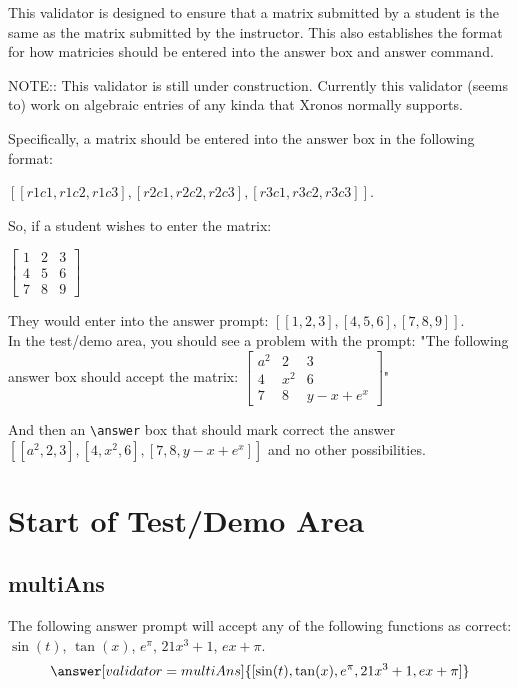 \documentclass{ximera}
\begin{document}
        This validator is designed to ensure that a matrix submitted by a student is the same as the matrix submitted by the instructor. This also establishes the format for how matricies should be entered into the answer box and answer command.
    
        NOTE:: This validator is still under construction. Currently this validator (seems to) work on algebraic entries of any kinda that Xronos normally supports.
        
        Specifically, a matrix should be entered into the answer box in the following format:
        
        $[ [r1c1,r1c2,r1c3],[r2c1,r2c2,r2c3],[r3c1,r3c2,r3c3] ]$.
        
        So, if a student wishes to enter the matrix:
        
        $\left[\begin{matrix}
        1 & 2 & 3 \\
        4 & 5 & 6 \\
        7 & 8 & 9
        \end{matrix}\right]$
        
        They would enter into the answer prompt: $[ [1,2,3], [4,5,6], [7,8,9] ]$.\\

        In the test/demo area, you should see a problem with the prompt:
            "The following answer box should accept the matrix:
            $\left[\begin{matrix}
            a^2 & 2 & 3 \\
            4 & x^2 & 6 \\
            7 & 8 & y-x+e^x
            \end{matrix}\right]$"

            And then an \verb|\answer| box that should mark correct the answer $[ [a^2,2,3], [4,x^2,6], [7,8,y-x+e^x] ]$ and no other possibilities.


\section{Start of Test/Demo Area}

    \subsection*{multiAns}
        \begin{problem}
            The following answer prompt will accept any of the following functions as correct: $\sin(t)$, $\tan(x)$, $e^\pi$, $21x^3 + 1$, $ex + \pi$.
            \[
                \answer[validator=multiAns]{[\sin(t),\tan(x),e^\pi,21x^3 + 1,ex + \pi]}
            \]
        \end{problem}
\end{document}
